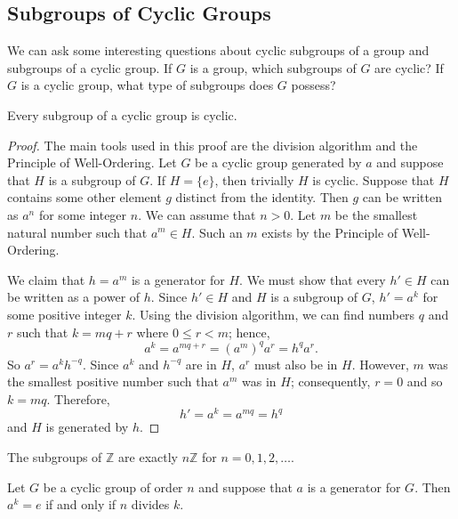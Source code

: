  
 
\subsection*{Subgroups of Cyclic Groups}
 
 
We can ask some interesting questions about cyclic subgroups of a
group and subgroups of a cyclic group.  If $G$ is a group, which
subgroups of $G$ are cyclic? If $G$ is a cyclic group, what type of
subgroups does $G$ possess? 
 
 
 
\begin{theorem}
Every subgroup of a cyclic group is cyclic.
\end{theorem}
 
 
\begin{proof}
The main tools used in this proof are the division algorithm and the
Principle of Well-Ordering. Let $G$ be a cyclic group generated by $a$
and suppose that $H$ is a subgroup of $G$. If $H = \{ e \}$, then
trivially $H$ is cyclic. Suppose that $H$ contains some other element
$g$ distinct from the identity. Then $g$ can be written as
$a^n$ for some integer $n$. We can assume that $n > 0$. Let $m$ be the
smallest natural number such that $a^m \in H$. Such an $m$ exists by
the Principle of Well-Ordering.
 
 
We claim that $h = a^m$ is a generator for $H$.  We must show that
every $h' \in H$ can be written as a power of $h$. Since $h' \in H$
and $H$ is a subgroup of $G$, $h' = a^k$ for some positive integer
$k$. Using the division algorithm, we can find numbers $q$ and $r$
such that $k = mq +r$ where $0 \leq r < m$; hence,
$$
a^k = a^{mq +r} = (a^m)^q a^r = h^q a^r.
$$
So $a^r = a^k h^{-q}$. Since $a^k$ and $h^{-q}$ are in $H$, $a^r$ must
also be in $H$.  However, $m$ was the smallest positive number such that
$a^m$ was in $H$; consequently, $r=0$ and so $k=mq$. Therefore, 
$$
h' = a^k = a^{mq} =  h^q
$$
and $H$ is generated by $h$.
\end{proof}
 
 
\begin{corollary}
The subgroups of ${\mathbb Z}$ are exactly $n{\mathbb Z}$ for $n = 0, 1, 2,
\ldots$. 
\end{corollary}
 
 
\begin{proposition}
Let $G$ be a cyclic group of order $n$ and suppose that $a$ is a
generator for  $G$. Then $a^k=e$ if and only if $n$ divides $k$.
\end{proposition}
 
